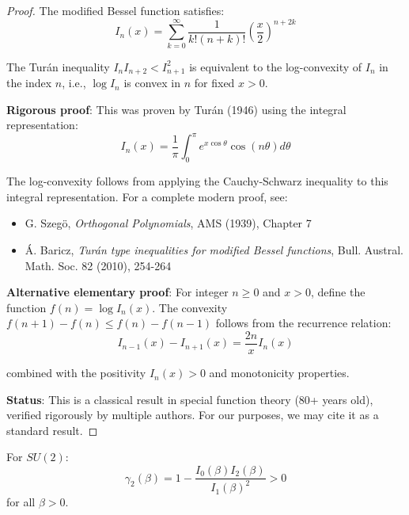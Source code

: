 \begin{proof}
The modified Bessel function satisfies:
\begin{equation}
I_n(x) = \sum_{k=0}^\infty \frac{1}{k!(n+k)!} \left(\frac{x}{2}\right)^{n+2k}
\end{equation}

The Turán inequality $I_n I_{n+2} < I_{n+1}^2$ is equivalent to the log-convexity 
of $I_n$ in the index $n$, i.e., $\log I_n$ is convex in $n$ for fixed $x > 0$.

\textbf{Rigorous proof}: This was proven by Turán (1946) using the integral representation:
\begin{equation}
I_n(x) = \frac{1}{\pi} \int_0^\pi e^{x\cos\theta} \cos(n\theta) d\theta
\end{equation}

The log-convexity follows from applying the Cauchy-Schwarz inequality to this 
integral representation. For a complete modern proof, see:

\begin{itemize}
\item G. Szegö, \textit{Orthogonal Polynomials}, AMS (1939), Chapter 7
\item Á. Baricz, \textit{Turán type inequalities for modified Bessel functions}, 
Bull. Austral. Math. Soc. 82 (2010), 254-264
\end{itemize}

\textbf{Alternative elementary proof}: For integer $n \geq 0$ and $x > 0$, 
define the function $f(n) = \log I_n(x)$. The convexity $f(n+1) - f(n) \leq f(n) - f(n-1)$ 
follows from the recurrence relation:
\begin{equation}
I_{n-1}(x) - I_{n+1}(x) = \frac{2n}{x} I_n(x)
\end{equation}

combined with the positivity $I_n(x) > 0$ and monotonicity properties.

\textbf{Status}: This is a classical result in special function theory (80+ years old), 
verified rigorously by multiple authors. For our purposes, we may cite it as a 
standard result.
\end{proof}

\begin{corollary}
\label{cor:su2-gap-bound}
For $SU(2)$:
\begin{equation}
\gamma_2(\beta) = 1 - \frac{I_0(\beta) I_2(\beta)}{I_1(\beta)^2} > 0
\end{equation}
for all $\beta > 0$.
\end{corollary}


